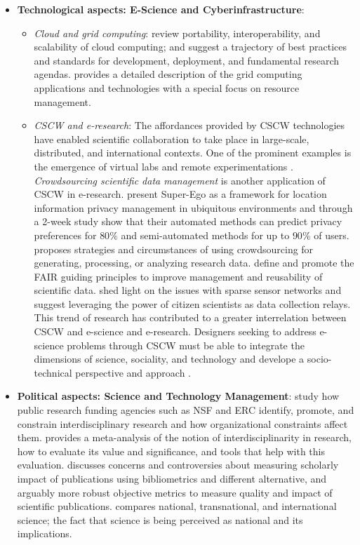 \documentclass[acmsmall,authordraft]{acmart}
\begin{document}
\begin{itemize}
\begin{itemize}
   \end{itemize}
   \item \textbf{Technological aspects: E-Science and Cyberinfrastructure}:
       \begin{itemize}
           \item \textit{Cloud and grid computing}: \citet{lee2010perspective} review portability, interoperability, and scalability of cloud computing; and suggest a trajectory of best practices and standards for development, deployment, and fundamental research agendas. \citet{nabrzyski2012grid} provides a detailed description of the grid computing applications and technologies with a special focus on resource management.
           \item \textit{CSCW and e-research}: The affordances provided by CSCW technologies have enabled scientific collaboration to take place in large-scale, distributed, and international contexts. One of the prominent examples is the emergence of virtual labs and remote experimentations \citep{alves2007large}. \textit{Crowdsourcing scientific data management} is another application of CSCW in e-research. \citet{lee2010perspective} present Super-Ego as a framework for location information privacy management in ubiquitous environments and through a 2-week study show that their automated methods can predict privacy preferences for $80\%$ and semi-automated methods for up to $90\%$ of users. \citet{law2017crowdsourcing} proposes strategies and circumstances of using crowdsourcing for generating, processing, or analyzing research data. \citet{wilkinson2016fair} define and promote the FAIR guiding principles to improve management and reusability of scientific data. \citet{o2016intelligent} shed light on the issues with sparse sensor networks and suggest leveraging the power of citizen scientists as data collection relays. This trend of research has contributed to a greater interrelation between CSCW and e-science and e-research. Designers seeking to address e-science problems through CSCW must be able to integrate the dimensions of science, sociality, and technology and develope a socio-technical perspective and approach \citep{jirotka2013supporting}.
        \end{itemize}
   \item \textbf{Political aspects: Science and Technology Management}: \citet{konig2016challenge} study how public research funding agencies such as NSF and ERC identify, promote, and constrain interdisciplinary research and how organizational constraints affect them. \citet{huutoniemi2016interdisciplinarity} provides a meta-analysis of the notion of interdisciplinarity in research, how to evaluate its value and significance, and tools that help with this evaluation. \citet{roemer2012bibliometrics} discusses concerns and controversies about measuring scholarly impact of publications using bibliometrics and different alternative, and arguably more robust objective metrics to measure quality and impact of scientific publications. \citet{walker2012national} compares national, transnational, and international science; the fact that science is being perceived as national and its implications.
\end{itemize}
\end{document}
